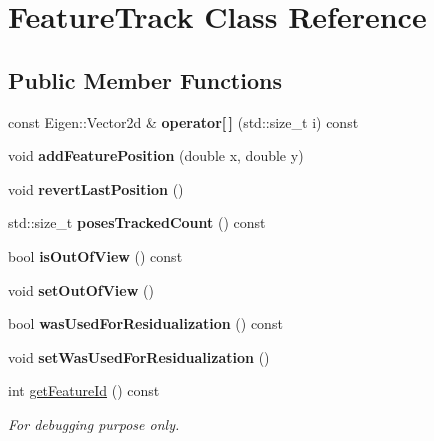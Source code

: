\hypertarget{class_feature_track}{\section{Feature\-Track Class Reference}
\label{class_feature_track}
}
\subsection*{Public Member Functions}
\begin{DoxyCompactItemize}
\item 
\hypertarget{class_feature_track_a1cdd11cd92ec65d2306f84c369e344ff}{const Eigen\-::\-Vector2d \& {\bfseries operator\mbox{[}$\,$\mbox{]}} (std\-::size\-\_\-t i) const }\label{class_feature_track_a1cdd11cd92ec65d2306f84c369e344ff}

\item 
\hypertarget{class_feature_track_a5f13b226ac16fb0c9abe692c17f0f0c6}{void {\bfseries add\-Feature\-Position} (double x, double y)}\label{class_feature_track_a5f13b226ac16fb0c9abe692c17f0f0c6}

\item 
\hypertarget{class_feature_track_aa21cd2b1af1f2aaea1e7d19631f80474}{void {\bfseries revert\-Last\-Position} ()}\label{class_feature_track_aa21cd2b1af1f2aaea1e7d19631f80474}

\item 
\hypertarget{class_feature_track_aa37fc3152eb3320a1161bdc638da2e09}{std\-::size\-\_\-t {\bfseries poses\-Tracked\-Count} () const }\label{class_feature_track_aa37fc3152eb3320a1161bdc638da2e09}

\item 
\hypertarget{class_feature_track_a966f8f018b7305d764216880f4a6f8ba}{bool {\bfseries is\-Out\-Of\-View} () const }\label{class_feature_track_a966f8f018b7305d764216880f4a6f8ba}

\item 
\hypertarget{class_feature_track_a75a507f6ac11d3a9319523d131c7949d}{void {\bfseries set\-Out\-Of\-View} ()}\label{class_feature_track_a75a507f6ac11d3a9319523d131c7949d}

\item 
\hypertarget{class_feature_track_abd64cf7785392e852bb93409fd063917}{bool {\bfseries was\-Used\-For\-Residualization} () const }\label{class_feature_track_abd64cf7785392e852bb93409fd063917}

\item 
\hypertarget{class_feature_track_a6317ed29fff383fc365d64d6c5ce1aa2}{void {\bfseries set\-Was\-Used\-For\-Residualization} ()}\label{class_feature_track_a6317ed29fff383fc365d64d6c5ce1aa2}

\item 
int \hyperlink{class_feature_track_aeba4f7f42fe7c065a17bd26e2817dcbe}{get\-Feature\-Id} () const 
\begin{DoxyCompactList}\small\item\em For debugging purpose only. \end{DoxyCompactList}\end{DoxyCompactItemize}


